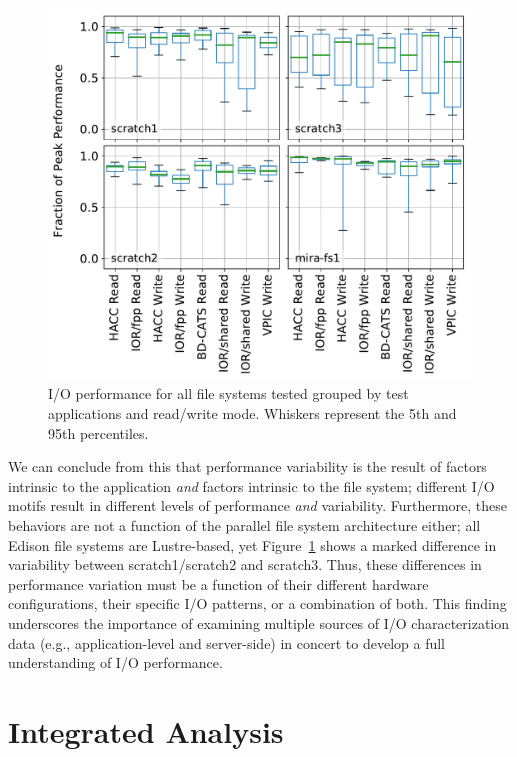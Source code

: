 \begin{figure}[t]
    \centering
    \includegraphics[width=1.0\columnwidth]{figs/perf-boxplots.pdf}
    \caption{I/O performance for all file systems tested grouped by test
    applications and read/write mode.  Whiskers represent the 5th and 95th
    percentiles.}
    \label{fig:perf-summary-boxplots-motif}
\vspace{-.2in}
\end{figure}

We can conclude from this that performance variability is the result of factors intrinsic to the application \emph{and} factors intrinsic to the file system;
different I/O motifs result in different levels of performance \emph{and} variability.
Furthermore, these behaviors are not a function of the parallel file system architecture either; all Edison file systems are Lustre-based, yet Figure~\ref{fig:perf-summary-boxplots-motif} shows a marked difference in variability between scratch1/scratch2 and scratch3.
Thus, these differences in performance variation must be a function of their different hardware configurations, their specific I/O patterns, or a combination of both.
This finding underscores the importance of examining multiple sources of I/O characterization data (e.g., application-level and server-side) in concert to develop a full understanding of I/O performance.

\section{Integrated Analysis} \label{sec:results/umami}

